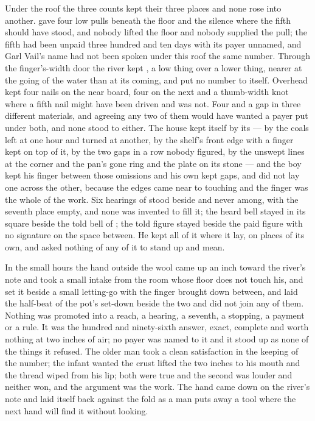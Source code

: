 Under the roof the three counts kept their three places and none rose into another.  gave four low pulls beneath the floor and the silence where the fifth should have stood, and nobody lifted the floor and nobody supplied the pull; the fifth had been unpaid three hundred and ten days with its payer unnamed, and Garl Vail's name had not been spoken under this roof the same number. Through the finger's-width door the river kept , a low thing over a lower thing, nearer at the going of the water than at its coming, and put no number to itself. Overhead  kept four nails on the near board, four on the next and a thumb-width knot where a fifth nail might have been driven and was not. Four and a gap in three different materials, and agreeing any two of them would have wanted a payer put under both, and none stood to either. The house kept itself by its  --- by the coals left at one hour and turned at another, by the shelf's front edge with a finger kept on top of it, by the two gaps in a row nobody figured, by the unswept lines at the corner and the pan's gone ring and the plate on its stone --- and the boy kept his finger between those omissions and his own kept gaps, and did not lay one across the other, because the edges came near to touching and the finger was the whole of the work. Six hearings of  stood beside and never among, with the seventh place empty, and none was invented to fill it; the heard bell stayed in its square beside the told bell of ; the told figure stayed beside the paid figure with no signature on the space between. He kept all of it where it lay, on places of its own, and asked nothing of any of it to stand up and mean.

In the small hours the hand outside the wool came up an inch toward the river's note and took a small intake from the room whose floor does not touch his, and set it beside a small letting-go with the finger brought down between, and laid the half-beat of the pot's set-down beside the two and did not join any of them. Nothing was promoted into a reach, a hearing, a seventh, a stopping, a payment or a rule. It was the hundred and ninety-sixth answer, exact, complete and worth nothing at two inches of air; no payer was named to it and it stood up as none of the things it refused. The older man took a clean satisfaction in the keeping of the number; the infant wanted the crust lifted the two inches to his mouth and the thread wiped from his lip; both were true and the second was louder and neither won, and the argument was the work. The hand came down on the river's note and laid itself back against the fold as a man puts away a tool where the next hand will find it without looking.

